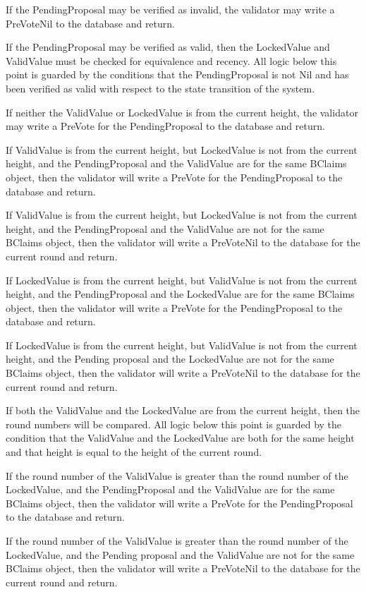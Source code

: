 If the PendingProposal may be verified as invalid, the validator may
write a PreVoteNil to the database and return.

If the PendingProposal may be verified as valid, then the LockedValue
and ValidValue must be checked for equivalence and recency.
All logic below this point is guarded by the conditions that the
PendingProposal is not Nil and has been verified as valid with respect
to the state transition of the system.

If neither the ValidValue or LockedValue is from the current height,
the validator may write a PreVote for the PendingProposal to the
database and return.

If ValidValue is from the current height, but LockedValue is not from
the current height, and the PendingProposal and the ValidValue are for
the same BClaims object, then the validator will write a PreVote for
the PendingProposal to the database and return.

If ValidValue is from the current height, but LockedValue is not from
the current height, and the PendingProposal and the ValidValue are not
for the same BClaims object, then the validator will write a PreVoteNil
to the database for the current round and return.

If LockedValue is from the current height, but ValidValue is not from
the current height, and the PendingProposal and the LockedValue are for
the same BClaims object, then the validator will write a PreVote for
the PendingProposal to the database and return.

If LockedValue is from the current height, but ValidValue is not from
the current height, and the Pending proposal and the LockedValue are
not for the same BClaims object, then the validator will write a
PreVoteNil to the database for the current round and return.

If both the ValidValue and the LockedValue are from the current height,
then the round numbers will be compared.
All logic below this point is guarded by the condition that the
ValidValue and the LockedValue are both for the same height and that
height is equal to the height of the current round.

If the round number of the ValidValue is greater than the round number
of the LockedValue, and the PendingProposal and the ValidValue are for
the same BClaims object, then the validator will write a PreVote for
the PendingProposal to the database and return.

If the round number of the ValidValue is greater than the round number
of the LockedValue, and the Pending proposal and the ValidValue are not
for the same BClaims object, then the validator will write a PreVoteNil
to the database for the current round and return.

